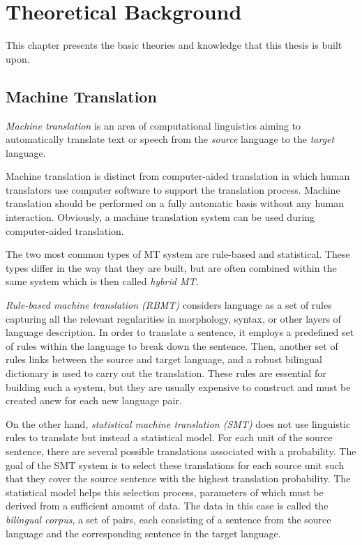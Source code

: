 \chapter{Theoretical Background}
\label{the}
This chapter presents the basic theories and knowledge that this thesis is built upon.

\section{Machine Translation}
\label{the-mt}

\textit{Machine translation} is an area of computational linguistics aiming to automatically translate text or speech from the \textit{source} language to the \textit{target} language.

Machine translation is distinct from computer-aided translation in which human translators use computer software to support the translation process.
Machine translation should be performed on a fully automatic basis without any human interaction. 
Obviously, a machine translation system can be used during computer-aided translation.

The two most common types of MT system are rule-based and statistical.
These types differ in the way that they are built, but are often combined within the same system which is then called \textit{hybrid MT}.

\textit{Rule-based machine translation (RBMT)} considers language as a set of rules capturing all the relevant regularities in morphology, syntax, or other layers of language description.
In order to translate a sentence, it employs a predefined set of rules within the language to break down the sentence.
Then, another set of rules links between the source and target language, and a robust bilingual dictionary is used to carry out the translation.
These rules are essential for building such a system, but they are usually expensive to construct and must be created anew for each new language pair.

On the other hand, \textit{statistical machine translation (SMT)} does not use linguistic rules to translate but instead a statistical model.
For each unit of the source sentence, there are several possible translations associated with a probability.
The goal of the SMT system is to select these translations for each source unit such that they cover the source sentence with the highest translation probability.
The statistical model helps this selection process, parameters of which must be derived from a sufficient amount of data.
The data in this case is called the \textit{bilingual corpus}, a set of pairs, each consisting of a sentence from the source language and the corresponding sentence in the target language.

